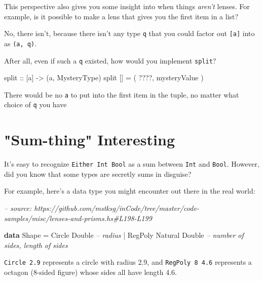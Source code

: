 \documentclass[]{article}
\newenvironment{Shaded}{}{}
\newcommand{\CommentTok}[1]{\textcolor[rgb]{0.38,0.63,0.69}{\textit{#1}}}
\newcommand{\DataTypeTok}[1]{\textcolor[rgb]{0.56,0.13,0.00}{#1}}
\newcommand{\FunctionTok}[1]{\textcolor[rgb]{0.02,0.16,0.49}{#1}}
\newcommand{\KeywordTok}[1]{\textcolor[rgb]{0.00,0.44,0.13}{\textbf{#1}}}
\newcommand{\NormalTok}[1]{#1}
\newcommand{\OtherTok}[1]{\textcolor[rgb]{0.00,0.44,0.13}{#1}}
\begin{document}
This perspective also gives you some insight into when things \emph{aren't}
lenses. For example, is it possible to make a lens that gives you the first item
in a list?

No, there isn't, because there isn't any type \texttt{q} that you could factor
out \texttt{{[}a{]}} into as \texttt{(a,\ q)}.

After all, even if such a \texttt{q} existed, how would you implement
\texttt{split}?

\begin{Shaded}
\begin{Highlighting}[]
\OtherTok{split ::}\NormalTok{ [a] }\OtherTok{->}\NormalTok{ (a, }\DataTypeTok{MysteryType}\NormalTok{)}
\NormalTok{split [] }\FunctionTok{=}\NormalTok{ ( }\FunctionTok{????}\NormalTok{, mysteryValue )}
\end{Highlighting}
\end{Shaded}

There would be no \texttt{a} to put into the first item in the tuple, no matter
what choice of \texttt{q} you have

\hypertarget{sum-thing-interesting}{%
\section{"Sum-thing" Interesting}\label{sum-thing-interesting}}

It's easy to recognize \texttt{Either\ Int\ Bool} as a sum between \texttt{Int}
and \texttt{Bool}. However, did you know that some types are secretly sums in
disguise?

For example, here's a data type you might encounter out there in the real world:

\begin{Shaded}
\begin{Highlighting}[]
\CommentTok{-- source: https://github.com/mstksg/inCode/tree/master/code-samples/misc/lenses-and-prisms.hs#L198-L199}

\KeywordTok{data} \DataTypeTok{Shape} \FunctionTok{=} \DataTypeTok{Circle}  \DataTypeTok{Double}           \CommentTok{-- radius}
           \FunctionTok{|} \DataTypeTok{RegPoly} \DataTypeTok{Natural} \DataTypeTok{Double}   \CommentTok{-- number of sides, length of sides}
\end{Highlighting}
\end{Shaded}

\texttt{Circle\ 2.9} represents a circle with radius 2.9, and
\texttt{RegPoly\ 8\ 4.6} represents a octagon (8-sided figure) whose sides all
have length 4.6.
\end{document}
